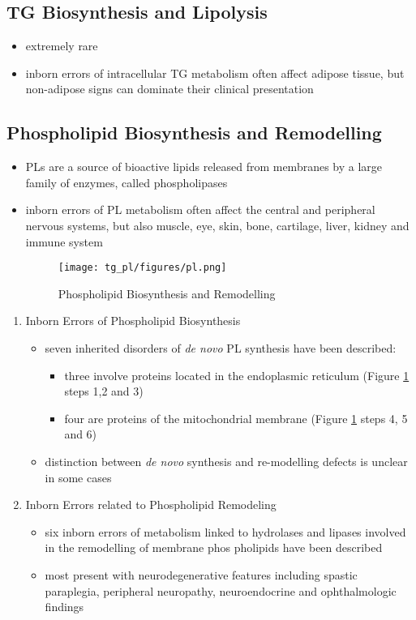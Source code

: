 \documentclass[12pt]{scrartcl}
\begin{document}
\subsection{TG Biosynthesis and Lipolysis}
\label{sec:org4664bba}
\begin{itemize}
\item extremely rare
\item inborn errors of intracellular TG metabolism often affect adipose
tissue, but non-adipose signs can dominate their clinical
presentation
\end{itemize}

\subsection{Phospholipid Biosynthesis and Remodelling}
\label{sec:org8c1c7c3}
\begin{itemize}
\item PLs are a source of bioactive lipids released from
membranes by a large family of enzymes, called phospholipases
\item inborn errors of PL metabolism often affect the central and
peripheral nervous systems, but also muscle, eye, skin, bone,
cartilage, liver, kidney and immune system 

\begin{figure}[htbp]
\centering
\texttt{[image: tg\_pl/figures/pl.png]}
\caption{\label{fig:orgf35ad7b}Phospholipid Biosynthesis and Remodelling}
\end{figure}
\end{itemize}

\begin{enumerate}
\item Inborn Errors of Phospholipid Biosynthesis
\label{sec:orgad6eca6}
\begin{itemize}
\item seven inherited disorders of \emph{de novo} PL synthesis have been described:
\begin{itemize}
\item three involve proteins located in the endoplasmic reticulum
(Figure \ref{fig:orgf35ad7b} steps 1,2 and 3)
\item four are proteins of the mitochondrial membrane (Figure
\ref{fig:orgf35ad7b} steps 4, 5 and 6)
\end{itemize}
\item distinction between \emph{de novo} synthesis and re-modelling defects is
unclear in some cases
\end{itemize}

\item Inborn Errors related to Phospholipid Remodeling
\label{sec:org2899a85}
\begin{itemize}
\item six inborn errors of metabolism linked to hydrolases and lipases
involved in the remodelling of membrane phos pholipids have been
described
\item most present with neurodegenerative features including spastic
paraplegia, peripheral neuropathy, neuroendocrine and ophthalmologic
findings
\end{itemize}
\end{enumerate}
\end{document}
